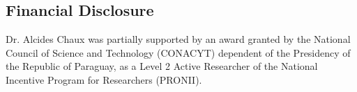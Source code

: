 \documentclass[11pt,letterpaper]{article}\usepackage[]{graphicx}\usepackage[]{color}
\begin{document}
\begin{multicols}{2}
\section*{Financial Disclosure}
Dr. Alcides Chaux was partially supported by an award granted by the National Council of Science and Technology (CONACYT) dependent of the Presidency of the Republic of Paraguay, as a Level 2 Active Researcher of the National Incentive Program for Researchers (PRONII).




\end{multicols}
\end{document}
